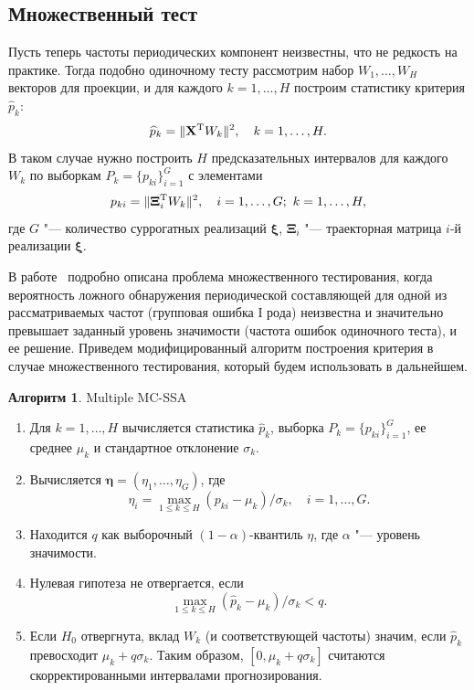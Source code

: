 \documentclass[specialist,
substylefile = spbu_report.rtx,
subf,href,colorlinks=true, 12pt]{disser}
\theoremstyle{definition}
\newtheorem{algorithm}{Алгоритм}
\newcommand{\bfxi}{\boldsymbol{\xi}}
\begin{document}
\subsection{Множественный тест}\label{sect:multiple_test}
Пусть теперь частоты периодических компонент неизвестны, что не редкость на практике. Тогда подобно одиночному тесту рассмотрим набор $W_1,\ldots,W_H$ векторов для проекции, и для каждого $k=1,\ldots,H$ построим статистику критерия $\widehat p_k$:
\begin{equation}\label{eq:mc-ssa_statisctics}
	\widehat p_k = \|\mathbf{X}^{\mathrm{T}} W_k\|^2,\quad k=1,\ldots,H.
\end{equation}
В таком случае нужно построить $H$ предсказательных интервалов для каждого $W_k$ по выборкам $P_k=\{p_{ki}\}_{i=1}^G$ с элементами
\begin{equation}\label{eq:mc-ssa_h0}
	p_{ki}=\|\mathbf{\Xi}_i^\rmT W_k\|^2,\quad i=1,\ldots,G;\ k=1,\ldots,H,
\end{equation}
где $G$ "--- количество суррогатных реализаций $\bfxi$, $\mathbf{\Xi}_i$ "--- траекторная матрица $i$-й реализации $\bfxi$. 

В работе~\cite{Golyandina_2023} подробно описана проблема множественного тестирования, когда вероятность ложного обнаружения периодической составляющей для одной из рассматриваемых частот (групповая ошибка I рода) неизвестна и значительно превышает заданный уровень значимости (частота ошибок одиночного теста), и ее решение. Приведем модифицированный алгоритм построения критерия в случае множественного тестирования, который будем использовать в дальнейшем.
\begin{algorithm}{Multiple MC-SSA~\cite{Golyandina_2023}}\label{alg:multiple_mc-ssa}
	\begin{enumerate}
		\item Для $k=1,\dots,H$ вычисляется статистика $\widehat{p}_k$, выборка $P_k=\{p_{ki}\}_{i=1}^G$, ее среднее $\mu_k$ и стандартное отклонение $\sigma_k$.
		\item Вычисляется $\mathbf{\eta}=(\eta_1,\dots,\eta_G)$, где
		      \[
			      \eta_i=\max_{1\leqslant k\leqslant H}(p_{ki}-\mu_k)/\sigma_k,\quad i=1,\dots,G.
		      \]
		\item Находится $q$ как выборочный $(1-\alpha)$-квантиль $\eta$, где $\alpha$ "--- уровень значимости.
		\item Нулевая гипотеза не отвергается, если
		      \[
			      \max_{1\leqslant k\leqslant H}(\widehat{p}_k-\mu_k)/\sigma_k<q.
		      \]
		\item Если $H_0$ отвергнута, вклад $W_k$ (и соответствующей частоты) значим, если $\widehat{p}_k$ превосходит $\mu_k+q\sigma_k$. Таким образом, $[0,\mu_k+q\sigma_k]$ считаются скорректированными интервалами прогнозирования.
	\end{enumerate}
\end{algorithm}
\end{document}
